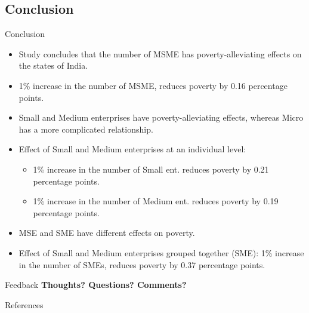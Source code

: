 \documentclass[10pt,aspectratio=169]{beamer}
\begin{document}
\subsection{Conclusion}
\begin{frame}{Conclusion}
    \begin{itemize}
        \item Study concludes that the number of MSME has poverty-alleviating effects on the states of India.
        \item 1\% increase in the number of MSME, reduces poverty by 0.16 percentage points.
        \item Small and Medium enterprises have poverty-alleviating effects, whereas Micro has a more complicated relationship.
        \item Effect of Small and Medium enterprises at an individual level:
        \begin{itemize}
            \item 1\% increase in the number of Small ent. reduces poverty by 0.21 percentage points. 
            \item 1\% increase in the number of Medium ent. reduces poverty by 0.19 percentage points.  
        \end{itemize}
        \item MSE and SME have different effects on poverty.
        \item Effect of Small and Medium enterprises grouped together (SME): 1\% increase in the number of SMEs, reduces poverty by 0.37 percentage points.
    \end{itemize}


\end{frame}
\begin{frame}[c]{Feedback}
    \centering
    \vspace{0.5cm}
    \LARGE
    \textbf{Thoughts? Questions? Comments?}
    \vspace{0.5cm}

\end{frame}

\begin{frame}[allowframebreaks]{References}
\printbibliography%
\end{frame}
\end{document}
